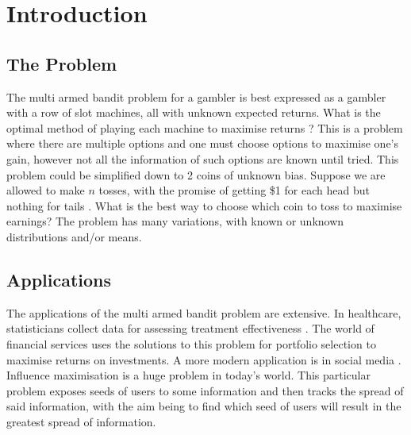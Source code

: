 \section{Introduction}\label{sec:introduction}

\subsection{The Problem}\label{subsec:the-problem}
The multi armed bandit problem for a gambler is best expressed as a gambler with a row of slot machines, all with unknown expected returns.
What is the optimal method of playing each machine to maximise returns \citep{vermorel}? This is a problem where there are multiple options and one must choose options to maximise one's gain, however not all the information of such options are known until tried.
\newline
\newline
This problem could be simplified down to 2 coins of unknown bias.
Suppose we are allowed to make $n$ tosses, with the promise of getting \$1 for each head but nothing for tails \citep{robbins1952some}.
What is the best way to choose which coin to toss to maximise earnings?
The problem has many variations, with known or unknown distributions and/or means.

\subsection{Applications}\label{subsec:applications}
The applications of the multi armed bandit problem are extensive.
In healthcare, statisticians collect data for assessing treatment effectiveness \citep{bouneffouf2019survey}.
The world of financial services uses the solutions to this problem for portfolio selection to maximise returns on investments.
\newline
\newline
A more modern application is in social media \citep{chen2013combinatorial}.
Influence maximisation is a huge problem in today's world.
This particular problem exposes seeds of users to some information and then tracks the spread of said information, with the aim being to find which seed of users will result in the greatest spread of information.

